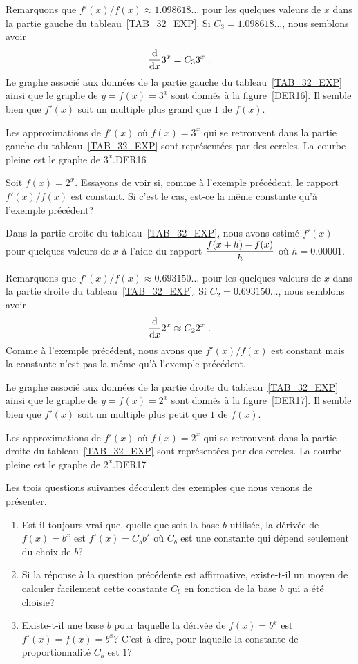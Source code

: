 {\begin{egg}
Remarquons que $f'(x) / f(x) \approx 1.098618\ldots$ pour les
quelques valeurs de $x$ dans la partie gauche du tableau~\ref{TAB_32_EXP}.  Si
$C_3 = 1.098618\ldots$, nous semblons avoir
\[
\dfdx{3^x}{x} = C_3 3^x \; .
\]
Le graphe associé aux données de la partie gauche du
tableau~\ref{TAB_32_EXP} ainsi que le graphe de $y=f(x)=3^x$ sont
donnés à la figure~\ref{DER16}.  Il semble bien que $f'(x)$ soit un
multiple plus grand que $1$ de $f(x)$.
\label{EGG_3_EXP}
\end{egg}

{Les approximations de $f'(x)$ où $f(x)=3^x$ qui se retrouvent dans la
partie gauche du tableau~\ref{TAB_32_EXP} sont représentées par des
cercles.  La courbe pleine est le graphe de $3^x$.}{DER16}

\begin{egg}
Soit $f(x) = 2^x$.  Essayons de voir si, comme à l'exemple précédent,
le rapport $f'(x)/f(x)$ est constant.  Si c'est le cas, est-ce la même
constante qu'à l'exemple précédent?

Dans la partie droite du tableau~\ref{TAB_32_EXP}, nous avons
estimé $f'(x)$ pour quelques valeurs de $x$ à l'aide du rapport
$\DS \frac{f(x+h)-f(x)}{h}$ où $h = 0.00001$.

Remarquons que $f'(x)/f(x) \approx 0.693150\ldots$ pour les quelques
valeurs de $x$ dans la partie droite du tableau~\ref{TAB_32_EXP}.  Si
$C_2 = 0.693150\ldots$, nous semblons avoir
\[
\dfdx{2^x}{x} \approx C_2 2^x \; .
\]
Comme à l'exemple précédent, nous avons que $f'(x)/f(x)$ est constant mais
la constante n'est pas la même qu'à l'exemple précédent.

Le graphe associé aux données de la partie droite du
tableau~\ref{TAB_32_EXP} ainsi que le graphe de $y=f(x)=2^x$ sont
donnés à la figure~\ref{DER17}.  Il semble bien que $f'(x)$ soit un
multiple plus petit que $1$ de $f(x)$.
\label{EGG_2_EXP}
\end{egg}

{Les approximations de $f'(x)$ où $f(x)=2^x$ qui se retrouvent dans la
partie droite du tableau~\ref{TAB_32_EXP} sont représentées par des
cercles.  La courbe pleine est le graphe de $2^x$.}{DER17}

Les trois questions suivantes découlent des exemples que nous venons de
présenter.
\begin{enumerate}
\item Est-il toujours vrai que, quelle que soit la base $b$ utilisée,
la dérivée de $f(x) = b^x$ est $f'(x) = C_b b^s$ où $C_b$ est une
constante qui dépend seulement du choix de $b$?
\item Si la réponse à la question précédente est affirmative, existe-t-il un
moyen de calculer facilement cette constante $C_b$ en fonction de la base $b$
qui a été choisie?
\item Existe-t-il une base $b$ pour laquelle la dérivée de $f(x)=b^x$
est $f'(x) = f(x) = b^x$?  C'est-à-dire, pour laquelle la constante de
proportionnalité $C_b$ est $1$?
\end{enumerate}

}
